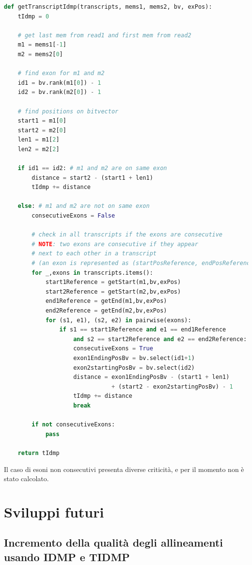 \begin{lstlisting}[language=Python]
def getTranscriptIdmp(transcripts, mems1, mems2, bv, exPos):
    tIdmp = 0

    # get last mem from read1 and first mem from read2
    m1 = mems1[-1]
    m2 = mems2[0]

    # find exon for m1 and m2
    id1 = bv.rank(m1[0]) - 1
    id2 = bv.rank(m2[0]) - 1

    # find positions on bitvector
    start1 = m1[0]
    start2 = m2[0]
    len1 = m1[2]
    len2 = m2[2]

    if id1 == id2: # m1 and m2 are on same exon
        distance = start2 - (start1 + len1)
        tIdmp += distance
        
    else: # m1 and m2 are not on same exon
        consecutiveExons = False

        # check in all transcripts if the exons are consecutive
        # NOTE: two exons are consecutive if they appear 
        # next to each other in a transcript
        # (an exon is represented as (startPosReference, endPosReference))
        for _,exons in transcripts.items():
            start1Reference = getStart(m1,bv,exPos)
            start2Reference = getStart(m2,bv,exPos)
            end1Reference = getEnd(m1,bv,exPos)
            end2Reference = getEnd(m2,bv,exPos)
            for (s1, e1), (s2, e2) in pairwise(exons):
                if s1 == start1Reference and e1 == end1Reference
                    and s2 == start2Reference and e2 == end2Reference:
                    consecutiveExons = True
                    exon1EndingPosBv = bv.select(id1+1)
                    exon2startingPosBv = bv.select(id2)
                    distance = exon1EndingPosBv - (start1 + len1) 
                               + (start2 - exon2startingPosBv) - 1
                    tIdmp += distance
                    break

        if not consecutiveExons:
            pass

    return tIdmp
\end{lstlisting}

Il caso di esoni non consecutivi presenta diverse criticità, e per il momento non è stato calcolato.

\newpage

\section{Sviluppi futuri}

\subsection{Incremento della qualità degli allineamenti usando IDMP e TIDMP}

